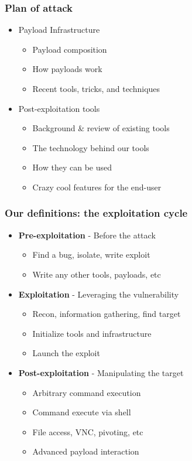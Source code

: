 \documentclass{beamer}
\newenvironment{sitemize}{\vspace{1mm}\begin{itemize}\itemsep 4pt\small}{\end{itemize}}
\begin{document}
\begin{frame}[t]
  \frametitle{Plan of attack}
  \begin{sitemize}
    \item Payload Infrastructure
    \begin{sitemize}
      \item Payload composition
      \item How payloads work
      \item Recent tools, tricks, and techniques
    \end{sitemize}
    \item Post-exploitation tools
    \begin{sitemize}
      \item Background \& review of existing tools
      \item The technology behind our tools
      \item How they can be used
      \item Crazy cool features for the end-user
    \end{sitemize}
  \end{sitemize}
\end{frame}

\begin{frame}[t]
    \frametitle{Our definitions: the exploitation cycle}

    \begin{sitemize}
        \item \textbf{Pre-exploitation} - Before the attack
        \begin{sitemize}
            \item Find a bug, isolate, write exploit
            \item Write any other tools, payloads, etc
        \end{sitemize}

        \pause
        \item \textbf{Exploitation} - Leveraging the vulnerability
        \begin{sitemize}
            \item Recon, information gathering, find target
            \item Initialize tools and infrastructure
            \item Launch the exploit
        \end{sitemize}

        \pause
        \item \textbf{Post-exploitation} - Manipulating the target
        \begin{sitemize}
            \item Arbitrary command execution
            \item Command execute via shell
            \item File access, VNC, pivoting, etc
            \item Advanced payload interaction
        \end{sitemize}
    \end{sitemize}
\end{frame}
\end{document}

